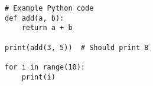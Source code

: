 \documentclass{article}
\begin{document}
\begin{lstlisting}
# Example Python code
def add(a, b):
    return a + b

print(add(3, 5))  # Should print 8

for i in range(10):
    print(i)
\end{lstlisting}
\end{document}
